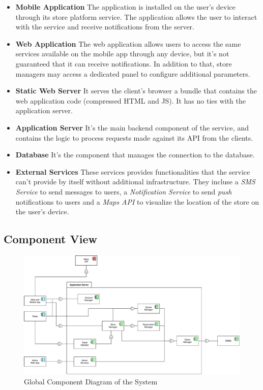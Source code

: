 \begin{itemize}
    \item \textbf{Mobile Application} The application is installed on the user's device through its store platform service. The application allows the user to interact with the service and receive notifications from the server.
    \item \textbf{Web Application} The web application allows users to access the same services available on the mobile app through any device, but it's not guaranteed that it can receive notifications. In addition to that, store managers may access a dedicated panel to configure additional parameters.
    \item \textbf{Static Web Server} It serves the client's browser a bundle that contains the web application code (compressed HTML and JS). It has no ties with the application server.
    \item \textbf{Application Server} It's the main backend component of the service, and contains the logic to process requests made against its API from the clients.
    \item \textbf{Database} It's the component that manages the connection to the database.
    \item \textbf{External Services} These services provides functionalities that the service can't provide by itself without additional infrastructure. They incluse a \emph{SMS Service} to send messages to users, a \emph{Notification Service} to send \emph{push} notifications to users and a \emph{Maps API} to visualize the location of the store on the user's device.
\end{itemize}

\subsection{Component View}
\begin{figure}[H]
    \includegraphics[width=\linewidth]{images/draw.io/component.pdf}
    \caption{Global Component Diagram of the System}
    \label{fig:component}
\end{figure}

